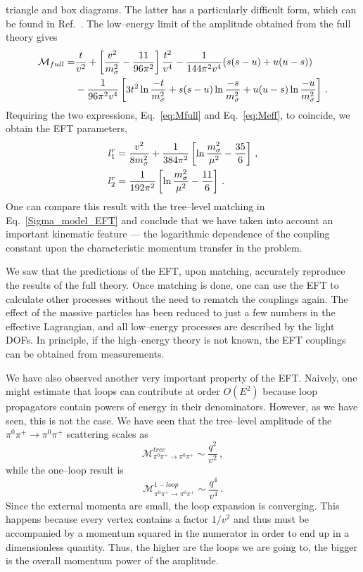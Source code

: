 \documentclass[11pt,a4paper]{article}
\newcommand{\be}{\begin{equation}}
\newcommand{\ee}{\end{equation}}
\newcommand\s{\sigma}
\renewcommand{\ln}{\mathop{\rm ln}\nolimits}
\begin{document}
triangle and box diagrams. The latter has a particularly difficult form, which can be found in Ref.~\cite{Denner:2010tr}. The low--energy limit of the amplitude obtained from the full theory gives
\be
\label{eq:Mfull}
\begin{split}
\mathcal{M}_{full}=&\frac{t}{v^2}+\left[\frac{v^2}{m_\sigma^2 }-\frac{11}{96 \pi^2}\right]\frac{t^2}{v^4}-\frac{1}{144\pi^2 v^4}(s(s-u)+u(u-s))\\
&-\frac{1}{96 \pi^2 v^4}\left[3t^2\ln\frac{-t}{m_\s^2}+s(s-u)\ln\frac{-s}{m_\s^2}+u(u-s)\ln\frac{-u}{m_\s^2}\right]\,.
\end{split}
\ee
Requiring the two expressions, Eq.~\eqref{eq:Mfull} and Eq.~\eqref{eq:Meff}, to coincide, we obtain
the EFT parameters,
\be
\begin{split}
&l_1^r=\frac{v^2}{8m_\s^2}+\frac{1}{384\pi^2}\left[\ln \frac{m_\s^2}{\mu^2}-\frac{35}{6}\right]\,,\\
&l_2^r=\frac{1}{192\pi^2}\left[\ln \frac{m_\s^2}{\mu^2}-\frac{11}{6}\right]\,.
\end{split}
\ee
One can compare this result with the tree--level matching in Eq.~\eqref{Sigma_model_EFT}
and conclude that we have taken into account an important kinematic feature --- the logarithmic
dependence of the coupling constant upon the characteristic momentum transfer in the problem.

We saw that the predictions of the EFT, upon matching, accurately
reproduce the results of the full theory. Once matching is done, one can use the EFT to
calculate other processes without the need to rematch the couplings again.
The effect of the massive particles has been reduced to just a few numbers in the effective
Lagrangian, and all low--energy processes are described by the light DOFs.
In principle, if the high--energy theory is not known, the EFT couplings can be obtained
from measurements.

We have also observed another very important property of the EFT. Naively, one
might estimate that loops can contribute at order $O(E^2)$ because loop propagators contain
powers of energy in their denominators. However, as we have seen, this is not the case.
We have seen that the tree--level amplitude of the $\pi^0\pi^+\to \pi^0\pi^+$ scattering
scales as
\be
\mathcal{M}^{tree}_{\pi^0\pi^+\to \pi^0\pi^+} \sim \frac{q^2}{v^2}\,,
\ee
while the one--loop result is
\be
\mathcal{M}^{1-loop}_{\pi^0\pi^+\to \pi^0\pi^+} \sim \frac{q^4}{v^4}\,.
\ee
Since the external momenta are small, the loop expansion is converging.
This happens because every vertex contains a factor $1/v^2$ and thus must be
accompanied by a momentum squared in the numerator in order to end up in a dimensionless quantity.
Thus, the higher are the loops we are going to, the bigger is the overall momentum power
of the amplitude.
\end{document}
